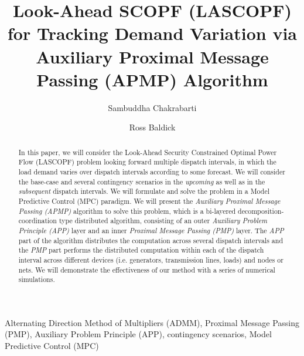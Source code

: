 \documentclass[preprint,12pt,3p]{elsarticle}
\begin{document}
\begin{frontmatter}
\title{Look-Ahead SCOPF (LASCOPF) for Tracking Demand Variation via Auxiliary Proximal Message Passing (APMP) Algorithm
}
\author[label1]{Sambuddha Chakrabarti}
\address[label1]{Electricity Market Research Group (EMReG), School of Electrical Engineering and Computer Science (EECS),
        KTH Royal Institute of Technology, Stockholm 10044, Sweden}
\author[label5]{Ross Baldick}
\address[label5]{Department of Electrical \& Computer Engineering (ECE), The University of Texas at Austin,
        Austin, TX 78705, USA}
\begin{abstract}
In this paper, we will consider the Look-Ahead Security Constrained Optimal Power Flow (LASCOPF) problem looking forward multiple dispatch intervals, in which the load demand varies over dispatch intervals according to some forecast. We will consider the base-case and several contingency scenarios in the \emph{upcoming} as well as in the \emph{subsequent} dispatch intervals. We will formulate and solve the problem in a Model Predictive Control (MPC) paradigm. We will present the \emph{Auxiliary Proximal Message Passing (APMP)} algorithm to solve this problem, which is a bi-layered decomposition-coordination type distributed algorithm, consisting of an outer \emph{Auxiliary Problem Principle (APP)} layer and an inner \emph{Proximal Message Passing (PMP)} layer. The \emph{APP} part of the algorithm distributes the computation across several dispatch intervals and the \emph{PMP} part performs the distributed computation within each of the dispatch interval across different devices (i.e. generators, transmission lines, loads) and nodes or nets. We will demonstrate the effectiveness of our method with a series of numerical simulations.\\
\end{abstract}
\begin{keyword}
Alternating Direction Method of Multipliers (ADMM), Proximal Message Passing (PMP), Auxiliary Problem Principle (APP), contingency scenarios, Model Predictive Control (MPC)
\end{keyword}
\end{frontmatter}
\end{document}
